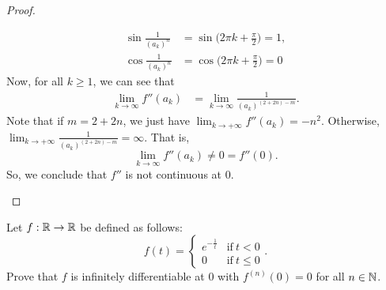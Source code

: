 \documentclass[a4paper]{article}
\begin{document}
\begin{proof}
\begin{enumerate}
        \begin{align*}
            \sin \frac{ 1 }{ ({a}_{k})^{n} } &= \sin \Big(2 \pi k  + \frac{ \pi }{ 2 }  \Big) = 1,  \\ 
            \cos \frac{ 1 }{ ({a}_{k})^{n} }  &= \cos \Big(  2 \pi k  + \frac{ \pi }{ 2 }  \Big) = 0 
        \end{align*}
        Now, for all \( k  \geq 1  \), we can see that 
        \begin{align*}
            \lim_{ k  \to  \infty  }  f''({a}_{k}) &= \lim_{ k  \to  \infty   }  \frac{ 1  }{ ({a}_{k})^{(2 + 2n) - m} }.
    \end{align*}
    Note that if \( m = 2 + 2n \), we just have \( \lim_{ k  \to + \infty  } f''({a}_{k}) = - n^{2}  \). Otherwise, \( \lim_{ k  \to  + \infty  } \frac{ 1 }{ ({a}_{k})^{(2+2n) - m} } = \infty  \). That is,
    \[  \lim_{ k  \to \infty  }  f''({a}_{k}) \neq 0 = f''(0). \]
    So, we conclude that \( f'' \) is not continuous at \( 0  \).
\end{enumerate}
\end{proof}
\begin{problem}
    Let \( f: \mathbb{R} \to \mathbb{R}  \) be defined as follows:
    \[  f(t) = 
    \begin{cases}
        e^{-\frac{ 1 }{ t } } &\text{if} \ t < 0 \\
        0 &\text{if} \ t \leq 0 
    \end{cases}. \]
    Prove that \( f  \) is infinitely differentiable at \( 0  \) with \( f^{(n)}(0) = 0  \) for all \( n \in \mathbb{N} \).
\end{problem}
\end{document}
